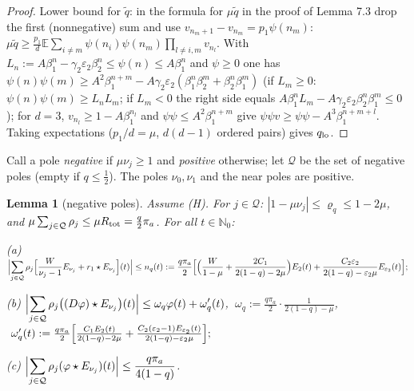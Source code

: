 \documentclass[11pt,a4paper]{article}
\newtheorem{lemma}[theorem]{Lemma}
\theoremstyle{definition}
\theoremstyle{remark}
\begin{document}
\begin{proof}
Lower bound for $\tilde q$: in the formula for $\mu\tilde q$ in the proof of Lemma 7.3 drop the first (nonnegative) sum and use $v_{n_m+1}-v_{n_m}=p_1\psi(n_m)$: $\mu\tilde q\ge\frac{p_1}{d}\mathbb E\sum_{i\ne m}\psi(n_i)\psi(n_m)\prod_{l\ne i,m}v_{n_l}$. With $L_n:=A\beta_1^n-\gamma_2\varepsilon_2\beta_2^n\le\psi(n)\le A\beta_1^n$ and $\psi\ge0$ one has $\psi(n)\psi(m)\ge A^2\beta_1^{n+m}-A\gamma_2\varepsilon_2(\beta_1^n\beta_2^m+\beta_2^n\beta_1^m)$ (if $L_m\ge0$: $\psi(n)\psi(m)\ge L_nL_m$; if $L_m<0$ the right side equals $A\beta_1^nL_m-A\gamma_2\varepsilon_2\beta_2^n\beta_1^m\le0$); for $d=3$, $v_{n_l}\ge1-A\beta_1^{n_l}$ and $\psi\psi\le A^2\beta_1^{n+m}$ give $\psi\psi v\ge\psi\psi-A^3\beta_1^{n+m+l}$. Taking expectations ($p_1/d=\mu$, $d(d-1)$ ordered pairs) gives $q_{\rm lo}$.
\end{proof}

Call a pole \emph{negative} if $\mu\nu_j\ge1$ and \emph{positive} otherwise; let $\mathcal Q$ be the set of negative poles (empty if $q\le\frac12$). The poles $\nu_0,\nu_1$ and the near poles are positive.

\begin{lemma}[{negative poles}]
Assume (H). For $j\in\mathcal Q$: $|1-\mu\nu_j|\le\varrho_q\le1-2\mu$, and $\mu\sum_{j\in\mathcal Q}\rho_j\le\mu R_{\rm tot}=\frac{q}{2}\pi_a$. For all $t\in\mathbb N_0$:

(a) $\displaystyle\Bigl|\sum_{j\in\mathcal Q}\rho_j\Bigl[\frac{W}{\nu_j-1}E_{\nu_j}+r_1\star E_{\nu_j}\Bigr](t)\Bigr|\le n_q(t):=\frac{q\pi_a}{2}\Bigl[\Bigl(\frac{W}{1-\mu}+\frac{2C_1}{2(1-q)-2\mu}\Bigr)E_2(t)+\frac{C_2\varepsilon_2}{2(1-q)-\varepsilon_2\mu}E_{\varepsilon_2}(t)\Bigr];$

(b) $\displaystyle\Bigl|\sum_{j\in\mathcal Q}\rho_j\bigl((D\varphi)\star E_{\nu_j}\bigr)(t)\Bigr|\le\omega_q\varphi(t)+\omega_q'(t)$, $\ \omega_q:=\frac{q\pi_a}{2}\cdot\frac{1}{2(1-q)-\mu}$, $\ \omega'_q(t):=\frac{q\pi_a}{2}\Bigl[\frac{C_1E_2(t)}{2(1-q)-2\mu}+\frac{C_2(\varepsilon_2-1)E_{\varepsilon_2}(t)}{2(1-q)-\varepsilon_2\mu}\Bigr];$

(c) $\displaystyle\Bigl|\sum_{j\in\mathcal Q}\rho_j(\varphi\star E_{\nu_j})(t)\Bigr|\le\frac{q\pi_a}{4(1-q)}$.
\end{lemma}
\end{document}
